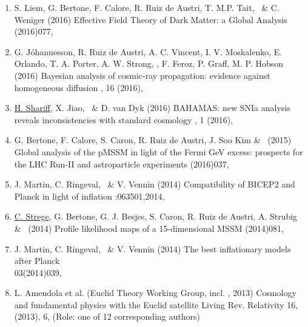 \begin{enumerate}
\item 
\paper
{S. Liem, G. Bertone, F. Calore, R. Ruiz de Austri, T. M.P. Tait, \rt\ \& C. Weniger  (2016)}
{Effective Field Theory of Dark Matter: a Global Analysis}
{(2016)077, }


\item 
\onestar \paper 
{G. Jóhannesson, R. Ruiz de Austri, A. C. Vincent, I. V. Moskalenko, E. Orlando, T. A. Porter, A. W. Strong, \rt, F. Feroz, P. Graff, M. P. Hobson (2016)}
{Bayesian analysis of cosmic-ray propagation: evidence against homogeneous diffusion}
{, 16 (2016), }

\item 
\paper
{\ul{H. Shariff}, X. Jiao, \rt\ \& D. van Dyk (2016)}
{BAHAMAS: new SNIa analysis reveals inconsistencies with standard cosmology}
{, 1 (2016), }

\item
\paper
{G. Bertone, F. Calore, S. Caron, R. Ruiz de Austri, J. Soo Kim \& \rt\ (2015)}
{Global analysis of the pMSSM in light of the Fermi GeV excess: prospects for the LHC Run-II and astroparticle experiments}
{(2016)037, }

\item
\paper 
{J. Martin, C. Ringeval, \rt\ \& V.  Vennin (2014)}
{Compatibility of BICEP2 and Planck in light of inflation}
{:063501,2014, }

\item 
\paper
{\ul{C. Strege}, G. Bertone, G. J. Besjes, S. Caron, R. Ruiz de Austri, A. Strubig \& \rt\ (2014)}
{Profile likelihood maps of a 15-dimensional MSSM}
{(2014)081, }

\item 
\onestar \paper
{J. Martin, C. Ringeval, \rt\ \& V. Vennin (2014)}
{The best inflationary models after Planck}
{\JCAP\\ 03(2014)039, }

\item 
\threestars \paper 
{L. Amendola et al. (Euclid Theory Working Group, incl. \rt, 2013)}
{Cosmology and fundamental physics with the Euclid satellite}
{Living Rev. Relativity 16, (2013), 6,  (Role: one of 12 corresponding authors)}


\end{enumerate}
